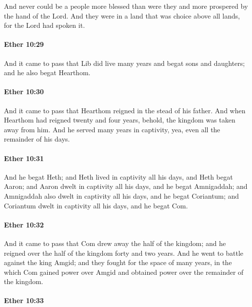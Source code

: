 			And never could be a people more blessed than were they
			and more prospered by the hand of the Lord.
			And they were in a land that was choice above all lands,
			for the Lord had spoken it.

		\paragraph{Ether 10:29} %
			\label{ETHER-10-29}

			And it came to pass that Lib did live many years
			and begat sons and daughters;
			and he also begat Hearthom.

		\paragraph{Ether 10:30} %
			\label{ETHER-10-30}

			And it came to pass that Hearthom reigned in the stead of his father.
			And when Hearthom had reigned twenty and four years,
			behold, the kingdom was taken away from him.
			And he served many years in captivity,
			yea, even all the remainder of his days.

		\paragraph{Ether 10:31} %
			\label{ETHER-10-31}

			And he begat Heth;
			and Heth lived in captivity all his days,
			and Heth begat Aaron;
			and Aaron dwelt in captivity all his days,
			and he begat Amnigaddah;
			and Amnigaddah also dwelt in captivity all his days,
			and he begat Coriantum;
			and Coriantum dwelt in captivity all his days,
			and he begat Com.

		\paragraph{Ether 10:32} %
			\label{ETHER-10-32}

			And it came to pass that Com drew away the half of the kingdom;
			and he reigned over the half of the kingdom forty and two years.
			And he went to battle against the king Amgid;
			and they fought for the space of many years,
			in the which Com gained power over Amgid
			and obtained power over the remainder of the kingdom.

		\paragraph{Ether 10:33} %
			\label{ETHER-10-33}

